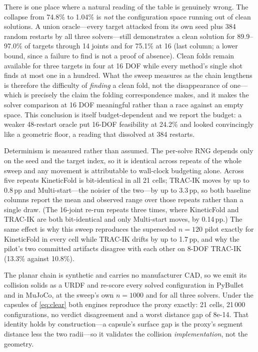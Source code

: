 \documentclass[10pt,conference]{IEEEtran}
\begin{document}
There is one place where a natural reading of the table is genuinely wrong. The
collapse from 74.8\% to 1.04\% is \emph{not} the configuration space running out
of clean solutions. A union oracle---every target attacked from its own seed plus 384
random restarts by all three solvers---still demonstrates a clean solution for
89.9--97.0\% of targets through 14 joints and for 75.1\% at 16 (last column; a lower
bound, since a failure to find is not a proof of absence). Clean folds remain
available for three targets in four at 16 DOF while every method's single shot
finds at most one in a hundred. What the sweep measures as the chain lengthens is
therefore the difficulty of \emph{finding} a clean fold, not the disappearance of
one---which is precisely the claim the folding correspondence makes, and it makes
the solver comparison at 16 DOF meaningful rather than a race against an empty
space. This conclusion is itself budget-dependent and we report the budget: a
weaker 48-restart oracle put 16-DOF feasibility at 24.2\% and looked convincingly
like a geometric floor, a reading that dissolved at 384 restarts.

Determinism is measured rather than assumed. The per-solve RNG depends only on
the seed and the target index, so it is identical across repeats of the whole
sweep and any movement is attributable to wall-clock budgeting alone. Across five
repeats KineticFold is bit-identical in all 21 cells; TRAC-IK moves by up to
0.8\,pp and Multi-start---the noisier of the two---by up to 3.3\,pp, so both
baseline columns report the mean and observed range over those repeats rather
than a single draw. (The 16-joint re-run repeats three times, where KineticFold
and TRAC-IK are both bit-identical and only Multi-start moves, by 0.14\,pp.)
The same effect is why this sweep reproduces the superseded
$n = 120$ pilot exactly for KineticFold in every cell while TRAC-IK drifts by up
to 1.7\,pp, and why the pilot's two committed artifacts disagree with each other
on 8-DOF TRAC-IK (13.3\% against 10.8\%).

The planar chain is synthetic and carries no manufacturer CAD, so we emit its
collision solids as a URDF and re-score every solved configuration in PyBullet
and in MuJoCo, at the sweep's own $n = 1000$ and for all three solvers. Under the
capsules of \eqref{eq:clear} both engines reproduce the proxy exactly: 21 cells,
21\,000 configurations, no verdict disagreement and a worst distance gap of
8e-14. That identity holds by construction---a capsule's surface gap is the
proxy's segment distance less the two radii---so it validates the collision
\emph{implementation}, not the geometry.
\end{document}
